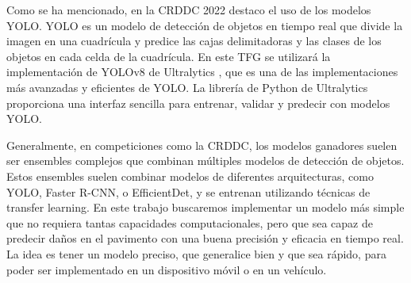 Como se ha mencionado, en la CRDDC 2022 destaco el uso de los modelos YOLO. YOLO \cite{YOLO} es un modelo de detección de objetos en tiempo real que divide la imagen en una cuadrícula y predice las cajas delimitadoras y las clases de los objetos en cada celda de la cuadrícula. En este TFG se utilizará la implementación de YOLOv8 de Ultralytics \cite{yolov8_ultralytics}, que es una de las implementaciones más avanzadas y eficientes de YOLO. La librería de Python de Ultralytics proporciona una interfaz sencilla para entrenar, validar y predecir con modelos YOLO.

Generalmente, en competiciones como la CRDDC, los modelos ganadores suelen ser ensembles complejos que combinan múltiples modelos de detección de objetos. Estos ensembles suelen combinar modelos de diferentes arquitecturas, como YOLO, Faster R-CNN, o EfficientDet, y se entrenan utilizando técnicas de transfer learning. En este trabajo buscaremos implementar un modelo más simple que no requiera tantas capacidades computacionales, pero que sea capaz de predecir daños en el pavimento con una buena precisión y eficacia en tiempo real. La idea es tener un modelo preciso, que generalice bien y que sea rápido, para poder ser implementado en un dispositivo móvil o en un vehículo.

